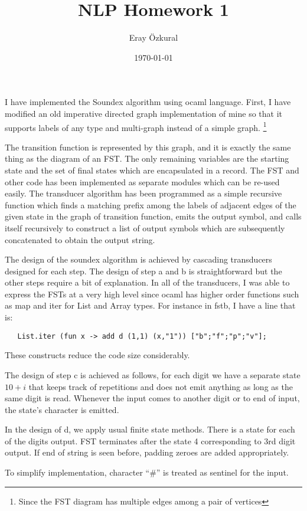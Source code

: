 \documentclass[a4paper,11pt]{article}
\title{ NLP Homework 1 }
\author{Eray \"Ozkural}
\date{\today}
\begin{document}
\maketitle

I have implemented the Soundex algorithm using ocaml language. First,
I have modified an old imperative directed graph implementation of
mine so that it supports labels of any type and multi-graph instead of
a simple graph.  \footnote{Since the FST diagram has multiple edges
  among a pair of vertices}

The transition function is represented by this graph, and it is
exactly the same thing as the diagram of an FST. The only remaining
variables are the starting state and the set of final states which are
encapsulated in a record. The FST and other code has been implemented
as separate modules which can be re-used easily. The transducer
algorithm has been programmed as a simple recursive function which
finds a matching prefix among the labels of adjacent edges of the
given state in the graph of transition function, emits the output
symbol, and calls itself recursively to construct a list of output
symbols which are subsequently concatenated to obtain the output
string.

The design of the soundex algorithm is achieved by cascading
transducers designed for each step. The design of step a and b is
straightforward but the other steps require a bit of
explanation. In all of the transducers, I was able to express the FSTs
at a very high level since ocaml has higher order functions such as
map and iter for List and Array types. For
instance in fstb, I have a line that is:
\begin{verbatim}
   List.iter (fun x -> add d (1,1) (x,"1")) ["b";"f";"p";"v"];
\end{verbatim}
These constructs reduce the code size considerably.

The design of step c is achieved as follows, for each digit we have a
separate state $10+i$ that keeps track of repetitions and does not
emit anything as long as the same digit is read. Whenever the input
comes to another digit or to end of input, the state's character
is emitted.

In the design of d, we apply usual finite state methods. There is a
state for each of the digits output. FST terminates after the state 4
corresponding to 3rd digit output. If end of string is seen before,
padding zeroes are added appropriately.

To simplify implementation, character ``\#'' is treated as sentinel
for the input.
\end{document}
